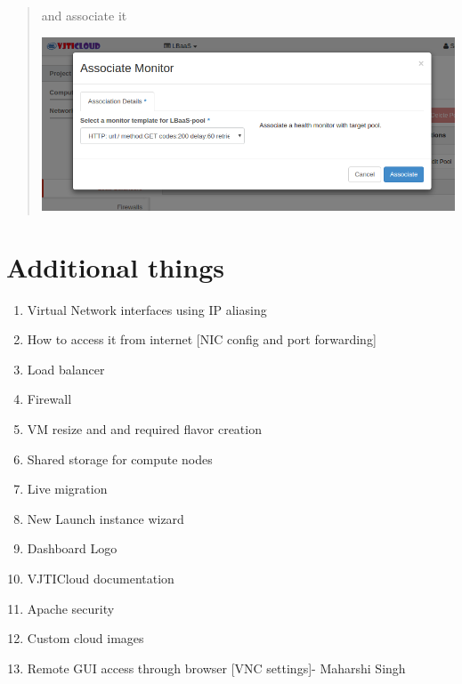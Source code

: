 \documentclass[letterpaper,10pt,english]{sphinxmanual}
\begin{document}
\begin{quote}
and associate it

\includegraphics{lbaas_associate_monitor.png}
\end{quote}


\section{Additional things}
\label{_source/projects/project-S::doc}\label{_source/projects/project-S:additional-things}\begin{enumerate}
\item {} 
Virtual Network interfaces using IP aliasing

\item {} 
How to access it from internet {[}NIC config and port forwarding{]}

\item {} 
Load balancer

\item {} 
Firewall

\item {} 
VM resize and and required flavor creation

\item {} 
Shared storage for compute nodes

\item {} 
Live migration

\item {} 
New Launch instance wizard

\item {} 
Dashboard Logo

\item {} 
VJTICloud documentation

\item {} 
Apache security

\item {} 
Custom cloud images

\item {} 
Remote GUI access through browser {[}VNC settings{]}- Maharshi Singh

\end{enumerate}
\end{document}
